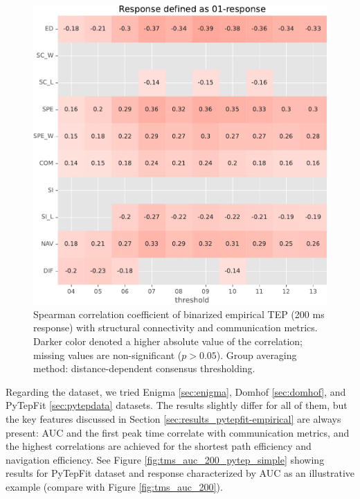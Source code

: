 \begin{figure}
    \centering
    \includegraphics[width=\textwidth]{images/nootebook_generated/pytepfit_results/empirical/200/not_over_threshold_nan/Mica-Mics_dist/Response defined as 01-response.pdf}
    \caption[Binarized TEP (200 ms) correlations (dist)]{Spearman correlation coefficient of binarized empirical TEP (200 ms response) with structural connectivity and communication metrics. Darker color denoted a higher absolute value of the correlation; missing values are non-significant ($p>0.05$). Group averaging method: distance-dependent consensus thresholding.}
    \label{fig:tms_01_200_dist}
\end{figure}

Regarding the dataset, we tried Enigma \ref{sec:enigma}, Domhof \ref{sec:domhof}, and PyTepFit \ref{sec:pytepdata} datasets. The results slightly differ for all of them, but the key features discussed in Section \ref{sec:results_pytepfit-empirical} are always present: AUC and the first peak time correlate with communication metrics, and the highest correlations are achieved for the shortest path efficiency and navigation efficiency. See Figure \ref{fig:tms_auc_200_pytep_simple} showing results for PyTepFit dataset and response characterized by AUC as an illustrative example (compare with Figure \ref{fig:tms_auc_200}).

